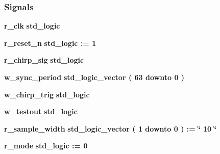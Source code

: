 \subsubsection*{Signals}
 \begin{DoxyCompactItemize}
\item 
{\bf r\+\_\+clk} {\bfseries \textcolor{comment}{std\+\_\+logic}\textcolor{vhdlchar}{ }} 
\item 
{\bf r\+\_\+reset\+\_\+n} {\bfseries \textcolor{comment}{std\+\_\+logic}\textcolor{vhdlchar}{ }\textcolor{vhdlchar}{ }\textcolor{vhdlchar}{\+:}\textcolor{vhdlchar}{=}\textcolor{vhdlchar}{ }\textcolor{vhdlchar}{ }\textcolor{vhdlchar}{\textquotesingle{}}\textcolor{vhdlchar}{ } \textcolor{vhdldigit}{1} \textcolor{vhdlchar}{ }\textcolor{vhdlchar}{\textquotesingle{}}\textcolor{vhdlchar}{ }} 
\item 
{\bf r\+\_\+chirp\+\_\+sig} {\bfseries \textcolor{comment}{std\+\_\+logic}\textcolor{vhdlchar}{ }} 
\item 
{\bf w\+\_\+sync\+\_\+period} {\bfseries \textcolor{comment}{std\+\_\+logic\+\_\+vector}\textcolor{vhdlchar}{ }\textcolor{vhdlchar}{(}\textcolor{vhdlchar}{ }\textcolor{vhdlchar}{ } \textcolor{vhdldigit}{63} \textcolor{vhdlchar}{ }\textcolor{keywordflow}{downto}\textcolor{vhdlchar}{ }\textcolor{vhdlchar}{ } \textcolor{vhdldigit}{0} \textcolor{vhdlchar}{ }\textcolor{vhdlchar}{)}\textcolor{vhdlchar}{ }} 
\item 
{\bf w\+\_\+chirp\+\_\+trig} {\bfseries \textcolor{comment}{std\+\_\+logic}\textcolor{vhdlchar}{ }} 
\item 
{\bf w\+\_\+testout} {\bfseries \textcolor{comment}{std\+\_\+logic}\textcolor{vhdlchar}{ }} 
\item 
{\bf r\+\_\+sample\+\_\+width} {\bfseries \textcolor{comment}{std\+\_\+logic\+\_\+vector}\textcolor{vhdlchar}{ }\textcolor{vhdlchar}{(}\textcolor{vhdlchar}{ }\textcolor{vhdlchar}{ } \textcolor{vhdldigit}{1} \textcolor{vhdlchar}{ }\textcolor{keywordflow}{downto}\textcolor{vhdlchar}{ }\textcolor{vhdlchar}{ } \textcolor{vhdldigit}{0} \textcolor{vhdlchar}{ }\textcolor{vhdlchar}{)}\textcolor{vhdlchar}{ }\textcolor{vhdlchar}{ }\textcolor{vhdlchar}{ }\textcolor{vhdlchar}{\+:}\textcolor{vhdlchar}{=}\textcolor{vhdlchar}{ }\textcolor{vhdlchar}{ }\textcolor{vhdlchar}{ }\textcolor{vhdlchar}{ }\textcolor{keyword}{\char`\"{} 10 \char`\"{}}\textcolor{vhdlchar}{ }} 
\item 
{\bf r\+\_\+mode} {\bfseries \textcolor{comment}{std\+\_\+logic}\textcolor{vhdlchar}{ }\textcolor{vhdlchar}{ }\textcolor{vhdlchar}{\+:}\textcolor{vhdlchar}{=}\textcolor{vhdlchar}{ }\textcolor{vhdlchar}{ }\textcolor{vhdlchar}{\textquotesingle{}}\textcolor{vhdlchar}{ } \textcolor{vhdldigit}{0} \textcolor{vhdlchar}{ }\textcolor{vhdlchar}{\textquotesingle{}}\textcolor{vhdlchar}{ }} 

\end{DoxyCompactItemize}
